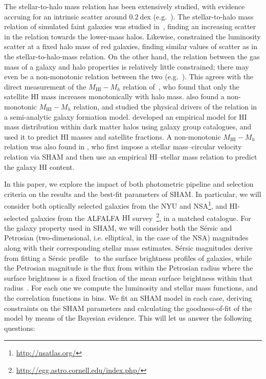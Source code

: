 \documentclass[usenatbib,useAMS]{mnras}
\newcommand{\HI}{\ensuremath{\mathrm{H}\scriptstyle\mathrm{I}}}
\begin{document}
The stellar-to-halo mass relation has been extensively studied, with evidence accruing for an intrinsic scatter around $0.2~\mathrm{dex}$ (e.g.~\citet{Behroozi2010, Moster2010, Puebla2011}).
The stellar-to-halo mass relation of simulated faint galaxies was studied in~\citet{Munshi2021}, finding an increasing scatter in the relation towards the lower-mass halos.
Likewise, \citet{Redmapper} constrained the luminosity scatter at a fixed halo mass of red galaxies, finding similar values of scatter as in the stellar-to-halo-mass relation.
On the other hand, the relation between the gas mass of a galaxy and halo properties is relatively little constrained; there may even be a non-monotonic relation between the two (e.g.~\citealt{Guo}). This agrees with the direct measurement of the $M_{\HI}-M_h$ relation of~\citet{Guo2020}, who found that only the satellite $\HI$ mass increases monotonically with halo mass. \citet{Chauhan2020} also found a non-monotonic $M_{\HI}-M_h$ relation, and studied the physical drivers of the relation in a semi-analytic galaxy formation model. \citet{Lu2020} developed an empirical model for $\HI$ mass distribution within dark matter halos using galaxy group catalogues, and used it to predict $\HI$ masses and satellite fractions. A non-monotonic $M_{\HI}-M_h$ relation was also found in \citet{Calette}, who first impose a stellar mass--circular velocity relation via \ac{SHAM} and then use an empirical $\HI$--stellar mass relation to predict the galaxy $\HI$ content.

In this paper, we explore the impact of both photometric pipeline and selection criteria on the results and the best-fit parameters of \ac{SHAM}.
In particular, we will consider both optically selected galaxies from the \ac{NYU} and \ac{NSA}\footnote{\url{http://nsatlas.org/}}, and $\HI$-selected galaxies from the ALFALFA $\HI$ survey~\citep{Giovanelli_1, Giovanelli_2, Saintonge, Haynes_2018}\footnote{\url{http://egg.astro.cornell.edu/index.php/}}, in a matched catalogue. For the galaxy property used in \ac{SHAM}, we will consider both the S\'ersic and Petrosian (two-dimensional, i.e. elliptical, in the case of the \ac{NSA}) magnitudes along with their corresponding stellar mass estimates. S\'ersic magnitudes derive from fitting a S\'ersic profile~\citep{Sersic} to the surface brightness profiles of galaxies, while the Petrosian magnitude is the flux from within the Petrosian radius where the surface brightness is a fixed fraction of the mean surface brightness within that radius~\citep{Petrosian}. For each one we compute the luminosity and stellar mass functions, and the correlation functions in bins. We fit an \ac{SHAM} model in each case, deriving constraints on the \ac{SHAM} parameters and calculating the goodness-of-fit of the model by means of the Bayesian evidence. This will let us answer the following questions:
\end{document}
